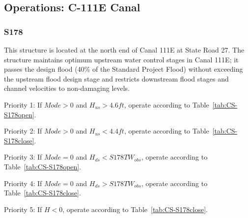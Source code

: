 \clearpage
\subsection{Operations: C-111E Canal}

\subsubsection{S178}
This structure is located at the north end of Canal 111E at State Road 27. The structure maintains optimum upstream water control stages in Canal 111E; it passes the design flood (40\% of the Standard Project Flood) without exceeding the upstream flood design stage and restricts downstream flood stages and channel velocities to non-damaging levels.



\begin{packed_items}
\item Priority 1: If $Mode>0$ and $H_{us}>4.6 ft$, operate according to Table~\ref{tab:CS-S178open}.
\item Priority 2: If $Mode>0$ and $H_{us}<4.4 ft$, operate according to Table~\ref{tab:CS-S178close}.
\item[]
\item Priority 3: If $Mode=0$ and $H_{ds}<S178TW_{obs}$, operate according to Table~\ref{tab:CS-S178open}.
\item Priority 4: If $Mode=0$ and $H_{ds}>S178TW_{obs}$, operate according to Table~\ref{tab:CS-S178close}.
\item[]
\item Priority 5: If $H<0$, operate according to Table~\ref{tab:CS-S178close}.
\end{packed_items}


